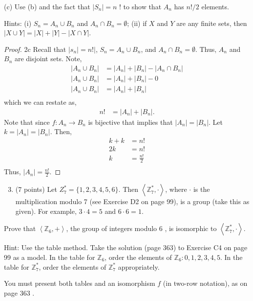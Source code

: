 \documentclass[12pt]{article}
\begin{document}
(c) Use (b) and the fact that $\left|S_{n}\right|=n$ ! to show that $A_{n}$ has $n ! / 2$ elements.

Hints: (i) $S_{n}=A_{n} \cup B_{n}$ and $A_{n} \cap B_{n}=\emptyset$; (ii) if $X$ and $Y$ are any finite sets, then $|X \cup Y|=|X|+|Y|-|X \cap Y|$.

\begin{proof}{2c} Recall that $|s_n| = n! |$, $S_n = A_n \cup B_n$, and $A_n \cap B_n = \emptyset$. 
Thus, $A_n$ and $B_n$ are disjoint sets. Note,
$$
\begin{aligned}
	|A_n \cup B_n| &= |A_n| + |B_n| - |A_n \cap B_n| \\
	|A_n \cup B_n| &= |A_n| + |B_n| - 0 \\
	|A_n \cup B_n| &= |A_n| + |B_n| \\
\end{aligned}
$$
which we can restate as,
$$
\begin{aligned}
	n! &= |A_n| + |B_n|.
\end{aligned}
$$
Note that since $f:A_n\rightarrow B_n$ is bijective that implies that $|A_n|=|B_n|$. Let $k=|A_n|=|B_n|$.
Then, 
$$
\begin{aligned}
	k+k &= n! \\
	2k &= n! \\
	k &= \frac{n!}{2} \\
\end{aligned}
$$
Thus, $|A_n|= \frac{n!}{2}$.
\end{proof}

\begin{enumerate}
  \setcounter{enumi}{2}
  \item (7 points) Let $Z_{7}^{*}=\{1,2,3,4,5,6\}$. Then $\left\langle\mathbb{Z}_{7}^{*}, \cdot\right\rangle$, where $\cdot$ is the multiplication modulo 7 (see Exercise D2 on page 99), is a group (take this as given). For example, $3 \cdot 4=5$ and $6 \cdot 6=1$.
\end{enumerate}

Prove that $\left\langle\mathbb{Z}_{6},+\right\rangle$, the group of integers modulo 6 , is isomorphic to $\left\langle\mathbb{Z}_{7}^{*}, \cdot\right\rangle$.

Hint: Use the table method. Take the solution (page 363) to Exercise C4 on page 99 as a model. In the table for $\mathbb{Z}_{6}$, order the elements of $\mathbb{Z}_{6}: 0,1,2,3,4,5$. In the table for $\mathbb{Z}_{7}^{*}$, order the elements of $\mathbb{Z}_{7}^{*}$ appropriately.

You must present both tables and an isomorphism $f$ (in two-row notation), as on page 363 .
\end{document}
